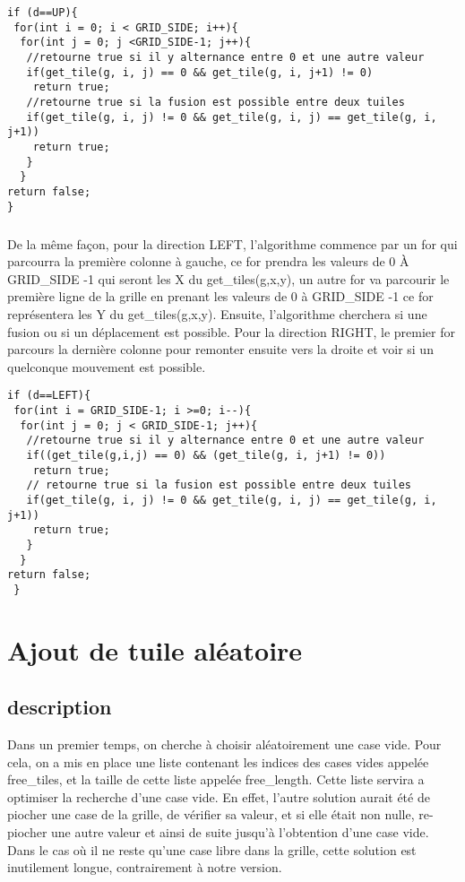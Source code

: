 \documentclass{report}
\begin{document}
\begin{lstlisting}
if (d==UP){
 for(int i = 0; i < GRID_SIDE; i++){
  for(int j = 0; j <GRID_SIDE-1; j++){
   //retourne true si il y alternance entre 0 et une autre valeur
   if(get_tile(g, i, j) == 0 && get_tile(g, i, j+1) != 0)
	return true;
   //retourne true si la fusion est possible entre deux tuiles
   if(get_tile(g, i, j) != 0 && get_tile(g, i, j) == get_tile(g, i, j+1))
	return true;
   }
  }
return false;
}
\end{lstlisting}

\paragraph{}De la même façon, pour la direction LEFT, l'algorithme
commence par un for qui parcourra la première colonne à gauche, ce for
prendra les valeurs de 0 À GRID{\_}SIDE -1 qui seront les X du get{\_}tiles(g,x,y), un autre for va parcourir le première ligne de la grille en prenant les valeurs de 0 à GRID{\_}SIDE -1 ce for représentera les Y du get{\_}tiles(g,x,y).
Ensuite, l'algorithme cherchera si une fusion ou si un déplacement est
possible. Pour la direction RIGHT, le premier for parcours la dernière
colonne pour remonter ensuite vers la droite et voir si un quelconque
mouvement est possible.

\begin{lstlisting}
if (d==LEFT){
 for(int i = GRID_SIDE-1; i >=0; i--){
  for(int j = 0; j < GRID_SIDE-1; j++){
   //retourne true si il y alternance entre 0 et une autre valeur
   if((get_tile(g,i,j) == 0) && (get_tile(g, i, j+1) != 0))
    return true;
   // retourne true si la fusion est possible entre deux tuiles
   if(get_tile(g, i, j) != 0 && get_tile(g, i, j) == get_tile(g, i, j+1))
	return true;
   }
  }
return false;
 }

\end{lstlisting}


\chapter{Ajout de tuile aléatoire}
\section{description}

Dans un premier temps, on cherche à choisir aléatoirement une case vide. Pour cela, on a mis en place une liste contenant les indices des cases vides appelée free{\_}tiles, et la taille de cette liste appelée free{\_}length. Cette liste servira a optimiser la recherche d'une case vide. En effet, l'autre solution aurait été de piocher une case de la grille, de vérifier sa valeur, et si elle était non nulle, re-piocher une autre valeur et ainsi de suite jusqu'à l'obtention d'une case vide. Dans le cas où il ne reste qu'une case libre dans la grille, cette solution est inutilement longue, contrairement à notre version. 
\end{document}
